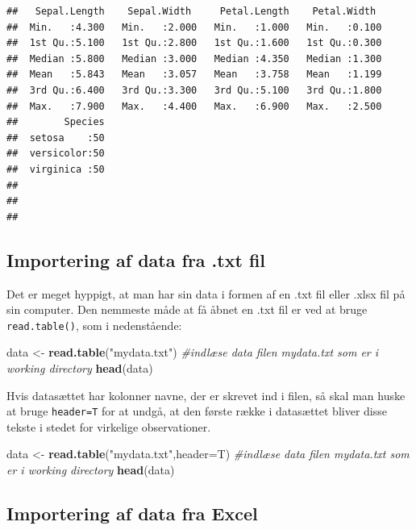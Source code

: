 \documentclass[
]{book}
\newenvironment{Shaded}{\begin{snugshade}}{\end{snugshade}}
\newcommand{\AttributeTok}[1]{\textcolor[rgb]{0.13,0.29,0.53}{#1}}
\newcommand{\CommentTok}[1]{\textcolor[rgb]{0.56,0.35,0.01}{\textit{#1}}}
\newcommand{\FunctionTok}[1]{\textcolor[rgb]{0.13,0.29,0.53}{\textbf{#1}}}
\newcommand{\NormalTok}[1]{#1}
\newcommand{\OtherTok}[1]{\textcolor[rgb]{0.56,0.35,0.01}{#1}}
\newcommand{\StringTok}[1]{\textcolor[rgb]{0.31,0.60,0.02}{#1}}
\begin{document}
\begin{verbatim}
##   Sepal.Length    Sepal.Width     Petal.Length    Petal.Width   
##  Min.   :4.300   Min.   :2.000   Min.   :1.000   Min.   :0.100  
##  1st Qu.:5.100   1st Qu.:2.800   1st Qu.:1.600   1st Qu.:0.300  
##  Median :5.800   Median :3.000   Median :4.350   Median :1.300  
##  Mean   :5.843   Mean   :3.057   Mean   :3.758   Mean   :1.199  
##  3rd Qu.:6.400   3rd Qu.:3.300   3rd Qu.:5.100   3rd Qu.:1.800  
##  Max.   :7.900   Max.   :4.400   Max.   :6.900   Max.   :2.500  
##        Species  
##  setosa    :50  
##  versicolor:50  
##  virginica :50  
##                 
##                 
## 
\end{verbatim}

\subsection{Importering af data fra .txt fil}\label{importering-af-data-fra-.txt-fil}

Det er meget hyppigt, at man har sin data i formen af en .txt fil eller .xlsx fil på sin computer. Den nemmeste måde at få åbnet en .txt fil er ved at bruge \texttt{read.table()}, som i nedenstående:

\begin{Shaded}
\begin{Highlighting}[]
\NormalTok{data }\OtherTok{\textless{}{-}} \FunctionTok{read.table}\NormalTok{(}\StringTok{"mydata.txt"}\NormalTok{) }\CommentTok{\#indlæse data filen mydata.txt som er i working directory}
\FunctionTok{head}\NormalTok{(data)}
\end{Highlighting}
\end{Shaded}

Hvis datasættet har kolonner navne, der er skrevet ind i filen, så skal man huske at bruge \texttt{header=T} for at undgå, at den første række i datasættet bliver disse tekste i stedet for virkelige observationer.

\begin{Shaded}
\begin{Highlighting}[]
\NormalTok{data }\OtherTok{\textless{}{-}} \FunctionTok{read.table}\NormalTok{(}\StringTok{"mydata.txt"}\NormalTok{,}\AttributeTok{header=}\NormalTok{T) }\CommentTok{\#indlæse data filen mydata.txt som er i working directory}
\FunctionTok{head}\NormalTok{(data)}
\end{Highlighting}
\end{Shaded}

\subsection{Importering af data fra Excel}\label{importering-af-data-fra-excel}
\end{document}

